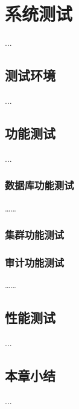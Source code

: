 
\chapter{系统测试}
...
\section{测试环境}
...
\section{功能测试}
...
\subsection{数据库功能测试}

……
\subsection{集群功能测试}
\subsection{审计功能测试}
……
\section{性能测试}
...
\section{本章小结}
...